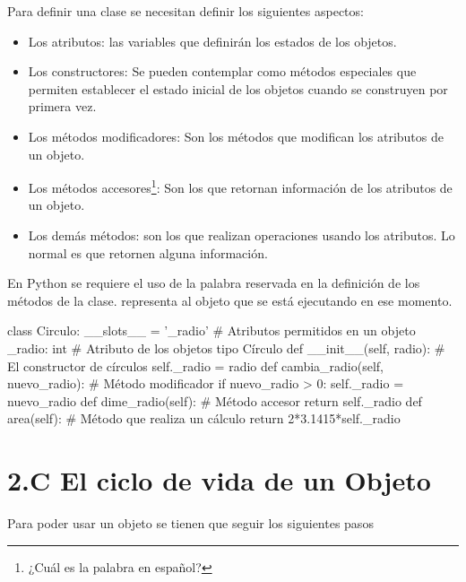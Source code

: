 Para definir una clase se necesitan definir los siguientes aspectos:

\begin{itemize}
\item Los atributos: las variables que definirán los estados de los objetos.
\item Los constructores: Se pueden contemplar como métodos especiales que permiten establecer el estado inicial de los objetos cuando se construyen por primera vez.
\item Los métodos modificadores: Son los métodos que modifican los atributos de un objeto.
\item Los métodos accesores\footnote{¿Cuál es la palabra en español?}: Son los que retornan información de los atributos de un objeto.
\item Los demás métodos: son los que realizan operaciones usando los atributos. Lo normal es que retornen alguna información.
\end{itemize}

En Python se requiere el uso de la palabra reservada  en la definición de los métodos de la clase.  representa al objeto que se está ejecutando en ese momento.

\begin{pyconsole}[][frame=single]
class Circulo:
    __slots__ = '_radio'       # Atributos permitidos en un objeto
    _radio: int                # Atributo de los objetos tipo Círculo
    def __init__(self, radio): # El constructor de círculos
        self._radio = radio       
    def cambia_radio(self, nuevo_radio): # Método modificador
        if nuevo_radio > 0:
            self._radio = nuevo_radio           
    def dime_radio(self):       # Método accesor
        return self._radio
    def area(self):             # Método que realiza un cálculo
        return 2*3.1415*self._radio
        
\end{pyconsole}



\section*{2.C El ciclo de vida de un Objeto} 


Para poder usar un objeto se tienen que seguir los siguientes pasos


